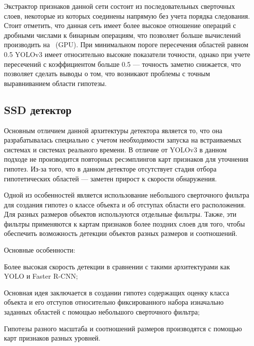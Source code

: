 Экстрактор признаков данной сети состоит из последовательных сверточных слоев, некоторые из которых соединены напрямую без учета порядка следования. Стоит отметить, что данная сеть имеет более высокое отношение операций с дробными числами к бинарным операциям, что позволяет больше вычислений производить на ~(GPU).
При минимальном пороге пересечения областей равном 0.5 YOLOv3 имеет относительно высокие показатели точности, однако при учете пересечений с коэффициентом больше 0.5 — точность заметно снижается, что позволяет сделать выводы о том, что возникают проблемы с точным выравниванием области гипотезы.

\subsection{SSD детектор}

Основным отличием данной архитектуры детектора является то, что она разрабатывалась специально с учетом необходимости запуска на встраиваемых системах и системах реального времени. В отличие от YOLOv3 в данном подходе не производится повторных ресэмплингов карт признаков для уточнения гипотез. Из-за того, что в данном детекторе отсутствует стадия отбора гипотетических областей — заметен прирост к скорости обнаружения. 

Одной из особенностей является использование небольшого сверточного фильтра для создания гипотез о классе объекта и об отступах области его расположения. Для разных размеров объектов используются отдельные фильтры. Также, эти фильтры применяются к картам признаков более поздних слоев для того, чтобы обеспечить возможность детекции объектов разных размеров и соотношений.

Основные особенности:
%
\begin{itemize*}
  \item Более высокая скорость детекции в сравнении с такими архитектурами как YOLO и Faster R-CNN;
  \item Основная идея заключается в создании гипотез содержащих оценку класса объекта и его отступов относительно фиксированного набора изначально заданных областей с помощью небольшого сверточного фильтра;
  \item Гипотезы разного масштаба и соотношений размеров производятся с помощью карт признаков разных уровней.
\end{itemize*}
%


